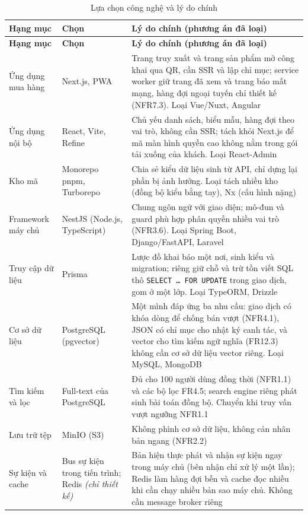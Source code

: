 \begingroup
\tblsetup\tblzebra
\begin{longtable}{L{2.90cm} L{3.40cm} L{8.95cm}}
\caption{Lựa chọn công nghệ và lý do chính}
\label{tab:congnghe} \\
\toprule
{}
\textbf{Hạng mục} & \textbf{Chọn} & \textbf{Lý do chính (phương án đã loại)} \\
\midrule
\endfirsthead
\toprule
{}
\textbf{Hạng mục} & \textbf{Chọn} & \textbf{Lý do chính (phương án đã loại)} \\
\midrule
\endhead
\bottomrule
\endfoot
Ứng dụng mua hàng & Next.js, PWA & Trang truy xuất và trang sản phẩm mở công khai qua QR, cần SSR và lập chỉ mục; service worker giữ trang đã xem và trang báo mất mạng, hàng đợi ngoại tuyến chỉ thiết kế (NFR7.3). Loại Vue/Nuxt, Angular \\
Ứng dụng nội bộ & React, Vite, Refine & Chủ yếu danh sách, biểu mẫu, hàng đợi theo vai trò, không cần SSR; tách khỏi Next.js để mã màn hình quyền cao không nằm trong gói tải xuống của khách. Loại React-Admin \\
Kho mã & Monorepo pnpm, Turborepo & Chia sẻ kiểu dữ liệu sinh từ API, chỉ dựng lại phần bị ảnh hưởng. Loại tách nhiều kho (đồng bộ kiểu bằng tay), Nx (cấu hình nặng) \\
Framework máy chủ & NestJS (Node.js, TypeScript) & Chung ngôn ngữ với giao diện; mô-đun và guard phù hợp phân quyền nhiều vai trò (NFR3.6). Loại Spring Boot, Django/FastAPI, Laravel \\
Truy cập dữ liệu & Prisma & Lược đồ khai báo một nơi, sinh kiểu và migration; riêng giữ chỗ và trừ tồn viết SQL thô \texttt{SELECT \ldots{} FOR UPDATE} trong giao dịch, gom ở một lớp. Loại TypeORM, Drizzle \\
Cơ sở dữ liệu & PostgreSQL (pgvector) & Một mình đáp ứng ba nhu cầu: giao dịch có khóa dòng để chống bán vượt (NFR4.1), JSON có chỉ mục cho nhật ký canh tác, và vector cho tìm kiếm ngữ nghĩa (FR12.3) không cần cơ sở dữ liệu vector riêng. Loại MySQL, MongoDB \\
Tìm kiếm và lọc & Full-text của PostgreSQL & Đủ cho 100 người dùng đồng thời (NFR1.1) và các bộ lọc FR4.5; search engine riêng phát sinh bài toán đồng bộ. Chuyển khi truy vấn vượt ngưỡng NFR1.1 \\
Lưu trữ tệp & MinIO (S3) & Không phình cơ sở dữ liệu, không cản nhân bản ngang (NFR2.2) \\
Sự kiện và cache & Bus sự kiện trong tiến trình; Redis \emph{(chỉ thiết kế)} & Bản hiện thực phát và nhận sự kiện ngay trong máy chủ (bên nhận chỉ xử lý một lần); Redis làm hàng đợi bền và cache đọc nhiều khi cần chạy nhiều bản sao máy chủ. Không cần message broker riêng \\

\end{longtable}
